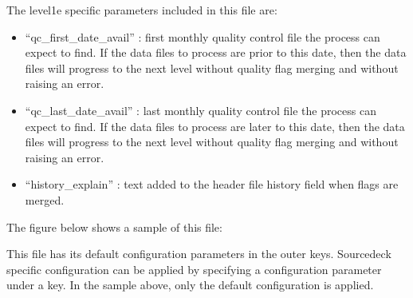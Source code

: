 \documentclass[letterpaper,10pt,english]{sphinxmanual}
\begin{document}
The level1e specific parameters included in this file are:
\begin{itemize}
\item {}
“qc\_first\_date\_avail” : first monthly quality control file the process can
expect to find. If the data files to process are prior to this date, then
the data files will progress to the next level without quality flag merging
and without raising an error.

\item {}
“qc\_last\_date\_avail” : last monthly quality control file the process can
expect to find. If the data files to process are later to this date, then
the data files will progress to the next level without quality flag merging
and without raising an error.

\item {}
“history\_explain” : text added to the header file history field when flags are
merged.

\end{itemize}

The figure below shows a sample of this file:

\begin{sphinxVerbatim}[commandchars=\\\{\}]
   
   
   
    
   
    
\end{sphinxVerbatim}

This file has its default configuration parameters in the outer keys.
Source\sphinxhyphen{}deck specific configuration can be applied by specifying a configuration
parameter under a  key. In the sample above, only the default
configuration is applied.
\end{document}
